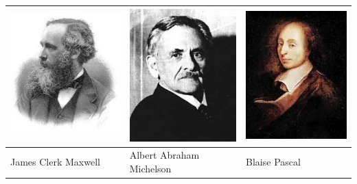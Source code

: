 \documentclass[a4paper]{scrartcl}
\begin{document}
\begin{aufgabe}[points={6}]
\begin{longtable}{|>{\centering\arraybackslash}p{4.2cm}|>{\centering\arraybackslash}p{4.2cm}|>{\centering\arraybackslash}p{4.2cm}|}
\includegraphics[scale=0.5]{Maxwell.jpg} & \includegraphics[scale=0.5]{Michelson.jpg} & \includegraphics[scale=0.5]{Pascal.jpg} \\
	\hline 
	James Clerk Maxwell & Albert Abraham Michelson & Blaise Pascal \\ 
	\hline 

\end{longtable}
\end{aufgabe}
\end{document}
